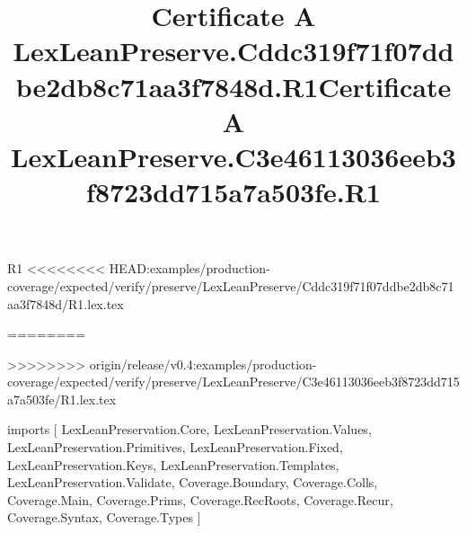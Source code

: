 \begin{lexlean}{R1}
<<<<<<<< HEAD:examples/production-coverage/expected/verify/preserve/LexLeanPreserve/Cddc319f71f07ddbe2db8c71aa3f7848d/R1.lex.tex
\title{Certificate A LexLeanPreserve.Cddc319f71f07ddbe2db8c71aa3f7848d.R1}
========
\title{Certificate A LexLeanPreserve.C3e46113036eeb3f8723dd715a7a503fe.R1}
>>>>>>>> origin/release/v0.4:examples/production-coverage/expected/verify/preserve/LexLeanPreserve/C3e46113036eeb3f8723dd715a7a503fe/R1.lex.tex
\begin{coremodule}
imports [
  LexLeanPreservation.Core,
  LexLeanPreservation.Values,
  LexLeanPreservation.Primitives,
  LexLeanPreservation.Fixed,
  LexLeanPreservation.Keys,
  LexLeanPreservation.Templates,
  LexLeanPreservation.Validate,
  Coverage.Boundary,
  Coverage.Colls,
  Coverage.Main,
  Coverage.Prims,
  Coverage.RecRoots,
  Coverage.Recur,
  Coverage.Syntax,
  Coverage.Types
]


\end{coremodule}
\end{lexlean}
